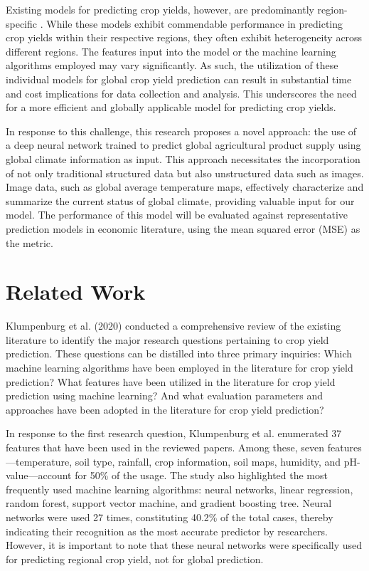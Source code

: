 \documentclass[11pt, oneside]{article}   	%
\begin{document}
Existing models for predicting crop yields, however, are predominantly region-specific \cite{citation_key1}\cite{citation_key3}. While these models exhibit commendable performance in predicting crop yields within their respective regions, they often exhibit heterogeneity across different regions. The features input into the model or the machine learning algorithms employed may vary significantly. As such, the utilization of these individual models for global crop yield prediction can result in substantial time and cost implications for data collection and analysis. This underscores the need for a more efficient and globally applicable model for predicting crop yields.

In response to this challenge, this research proposes a novel approach: the use of a deep neural network trained to predict global agricultural product supply using global climate information as input. This approach necessitates the incorporation of not only traditional structured data but also unstructured data such as images. Image data, such as global average temperature maps, effectively characterize and summarize the current status of global climate, providing valuable input for our model. The performance of this model will be evaluated against representative prediction models in economic literature, using the mean squared error (MSE) as the metric.

\section*{Related Work}

Klumpenburg et al. (2020) \cite{citation_key3} conducted a comprehensive review of the existing literature to identify the major research questions pertaining to crop yield prediction. These questions can be distilled into three primary inquiries: Which machine learning algorithms have been employed in the literature for crop yield prediction? What features have been utilized in the literature for crop yield prediction using machine learning? And what evaluation parameters and approaches have been adopted in the literature for crop yield prediction?

In response to the first research question, Klumpenburg et al. enumerated 37 features that have been used in the reviewed papers. Among these, seven features—temperature, soil type, rainfall, crop information, soil maps, humidity, and pH-value—account for 50\% of the usage. The study also highlighted the most frequently used machine learning algorithms: neural networks, linear regression, random forest, support vector machine, and gradient boosting tree. Neural networks were used 27 times, constituting 40.2\% of the total cases, thereby indicating their recognition as the most accurate predictor by researchers. However, it is important to note that these neural networks were specifically used for predicting regional crop yield, not for global prediction.
\end{document}
